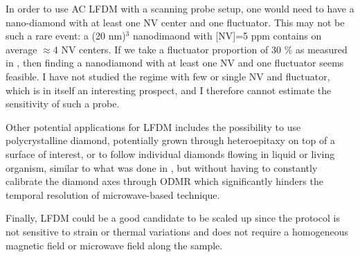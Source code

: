 \documentclass[a4paper,11pt]{report}
\begin{document}
In order to use AC LFDM with a scanning probe setup, one would need to have a nano-diamond with at least one NV center and one fluctuator. This may not be such a rare event: a (20 nm)$^{3}$ nanodimaond with [NV]=5 ppm contains on average $\approx 4$ NV centers. If we take a fluctuator proportion of 30 \% as measured in \citep{choi2017depolarization}, then finding a nanodiamond with at least one NV and one fluctuator  seems feasible. I have not studied the regime with few or single NV and fluctuator, which is in itself an interesting prospect, and I therefore cannot estimate the sensitivity of such a probe. 

Other potential applications for LFDM includes the possibility to use polycrystalline diamond, potentially grown through heteroepitaxy on top of a surface of interest, or to follow individual diamonds flowing in liquid or living organism, similar to what was done in \citep{feng2021association}, but without having to constantly calibrate the diamond axes through ODMR which significantly hinders the temporal resolution of microwave-based technique.

Finally, LFDM could be a good candidate to be scaled up since the protocol is not sensitive to strain or thermal variations and does not require a homogeneous magnetic field or microwave field along the sample.


\printbibliography
\end{document}
